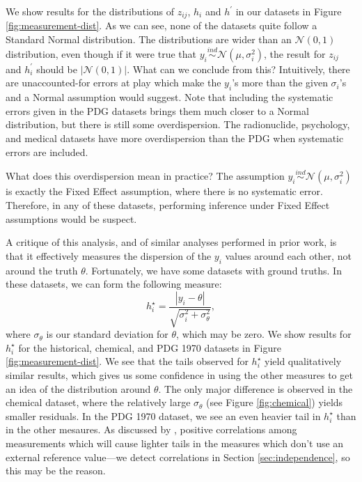 \documentclass[letterpaper,12pt]{article}
\begin{document}
We show results for the distributions of $z_{ij}$, $h_i$ and $h^\prime$ in our datasets in Figure \ref{fig:measurement-dist}. As we can see, none of the datasets quite follow a Standard Normal distribution. The distributions are wider than an $\mathcal{N}(0,1)$ distribution, even though if it were true that $y_i\overset{ind}{\sim} \mathcal{N}(\mu,\sigma_i^2)$, the result for $z_{ij}$ and $h_i^\prime$ should be $|\mathcal{N}(0,1)|$. What can we conclude from this? Intuitively, there are unaccounted-for errors at play which make the $y_i$'s more than the given $\sigma_i$'s and a Normal assumption would suggest. Note that including the systematic errors given in the PDG datasets brings them much closer to a Normal distribution, but there is still some overdispersion. The radionuclide, psychology, and medical datasets have more overdispersion than the PDG when systematic errors are included.

What does this overdispersion mean in practice? The assumption $y_i\overset{ind}{\sim} \mathcal{N}(\mu,\sigma_i^2)$ is exactly the Fixed Effect assumption, where there is no systematic error. Therefore, in any of these datasets, performing inference under Fixed Effect assumptions would be suspect.

A critique of this analysis, and of similar analyses performed in prior work, is that it effectively measures the dispersion of the $y_i$ values around each other, not around the truth $\theta$. Fortunately, we have some datasets with ground truths. In these datasets, we can form the following measure:
\begin{equation}\label{eq:histar}
  h^\star_i = \frac{|y_i-\theta|}{\sqrt{\sigma_i^2+\sigma_\theta^2}},
\end{equation}
where $\sigma_\theta$ is our standard deviation for $\theta$, which may be zero. We show results for $h^\star_i$ for the historical, chemical, and PDG 1970 datasets in Figure \ref{fig:measurement-dist}. We see that the tails observed for $h^\star_i$ yield qualitatively similar results, which gives us some confidence in using the other measures to get an idea of the distribution around $\theta$. The only major difference is observed in the chemical dataset, where the relatively large $\sigma_\theta$ (see Figure \ref{fig:chemical}) yields smaller residuals. In the PDG 1970 dataset, we see an even heavier tail in $h^\star_i$ than in the other mesaures. As discussed by \citet[sec.~3.6]{bailey2017not}, positive correlations among measurements which will cause lighter tails in the measures which don't use an external reference value---we detect correlations in Section \ref{sec:independence}, so this may be the reason.
\end{document}
